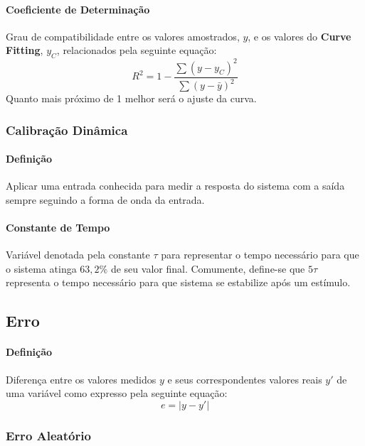 \documentclass{article}
\begin{document}
            \paragraph{Coeficiente de Determinação}Grau de compatibilidade entre os valores amostrados, $y$, e os valores do \textbf{Curve Fitting}, $y_{C}$, relacionados pela seguinte equação:
                \begin{equation}
                    \boxed{
                        R^{2} = 1 - \frac{\sum(y - y_{C})^{2}}{\sum(y - \bar{y})^{2}}
                    }
                \end{equation}
            Quanto mais próximo de 1 melhor será o ajuste da curva.

        \subsubsection{Calibração Dinâmica}
            \paragraph{Definição}Aplicar uma entrada conhecida para medir a resposta do sistema com a saída sempre seguindo a forma de onda da entrada.

            \paragraph{Constante de Tempo}Variável denotada pela constante $\tau$ para representar o tempo necessário para que o sistema atinga $63,2\%$ de seu valor final. Comumente, define-se que $5\tau$ representa o tempo necessário para que sistema se estabilize após um estímulo.

    \subsection{Erro}
        \paragraph{Definição}Diferença entre os valores medidos $y$ e seus correspondentes valores reais $y'$ de uma variável como expresso pela seguinte equação:
            \begin{equation}
                \boxed{
                    e = |y - y'|
                }
            \end{equation}

        \subsubsection{Erro Aleatório}
\end{document}
